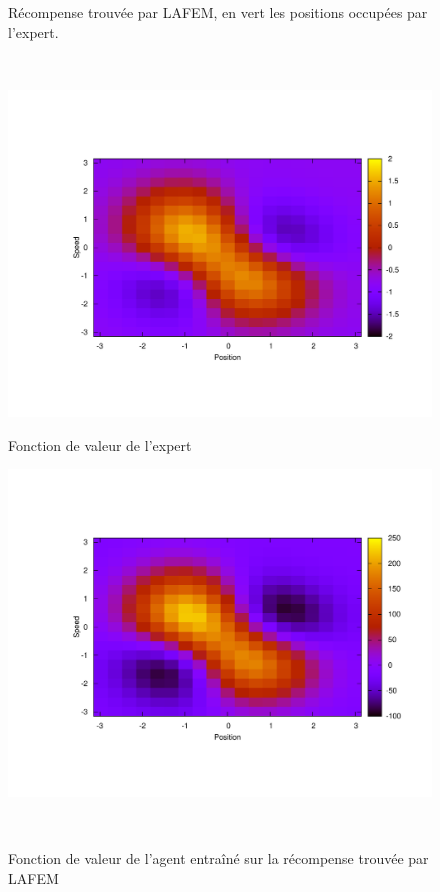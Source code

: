 \documentclass[publibook-draft]{CAp2012}
\begin{document}
\begin{figure}
\begin{minipage}[t]{.4\linewidth}
\begin{center}
       \caption{Récompense trouvée par LAFEM, en vert les positions occupées par l'expert.}
       \label{lafemR.fig}
    \end{center}
\end{minipage}\\
\begin{minipage}[t]{.4\linewidth}
    \begin{center}
       \includegraphics[width=\textwidth]{LAFEM_Exp3_Vexpert.pdf}
       \caption{Fonction de valeur de l'expert}
       \label{trueV.fig}
    \end{center}
\end{minipage}
\hfill
\begin{minipage}[t]{.4\linewidth}
    \begin{center}
       \includegraphics[width=\textwidth]{LAFEM_Exp3_Vagent.pdf}
       \caption{Fonction de valeur de l'agent entraîné sur la récompense trouvée par LAFEM}
       \label{lafemV.fig}
    \end{center}
\end{minipage}\\
\end{figure}
\end{document}
